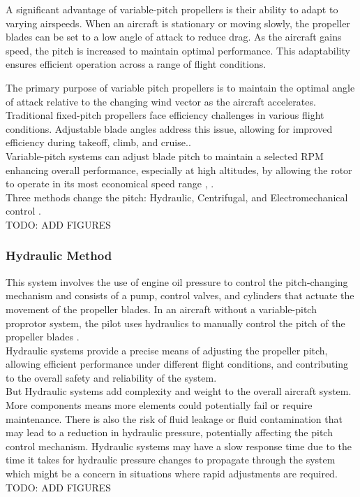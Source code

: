 A significant advantage of variable-pitch propellers is their ability to adapt to varying airspeeds. 
When an aircraft is stationary or moving slowly, the propeller blades can be set to a low angle of attack to reduce drag. As the aircraft gains speed, the pitch is increased to maintain optimal performance. 
This adaptability ensures efficient operation across a range of flight conditions.

The primary purpose of variable pitch propellers is to maintain the optimal angle of attack relative to the changing wind vector as the aircraft accelerates.
Traditional fixed-pitch propellers face efficiency challenges in various flight conditions.
Adjustable blade angles address this issue, allowing for improved efficiency during takeoff, climb, and cruise.\cite{VPP3}.\\

Variable-pitch systems can adjust blade pitch to maintain a selected \gls{RPM} enhancing overall performance, especially at high altitudes, by allowing the rotor to operate in its most economical speed range \cite{VPP2}, \cite{VPP3}.\\

Three methods change the pitch: Hydraulic, Centrifugal, and Electromechanical control \cite{VPP2}.\\
TODO: ADD FIGURES

\subsubsection{Hydraulic Method}
This system involves the use of engine oil pressure to control the pitch-changing mechanism and consists of a pump, control valves, and cylinders that actuate the movement of the propeller blades.
In an aircraft without a variable-pitch proprotor system, the pilot uses hydraulics to manually control the pitch of the propeller blades \cite{VPP2}.\\

Hydraulic systems provide a precise means of adjusting the propeller pitch, allowing efficient performance under different flight conditions, and contributing to the overall safety and reliability of the system.\\

But Hydraulic systems add complexity and weight to the overall aircraft system. 
More components means more elements could potentially fail or require maintenance. 
There is also the risk of fluid leakage or fluid contamination that may lead to a reduction in hydraulic pressure, potentially affecting the pitch control mechanism.
Hydraulic systems may have a slow response time due to the time it takes for hydraulic pressure changes to propagate through the system which might be a concern in situations where rapid adjustments are required.\cite{VPP2}
TODO: ADD FIGURES

